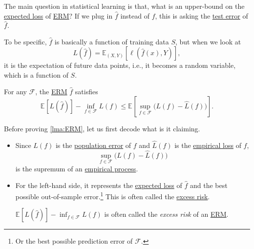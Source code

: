 The main question in statistical learning is that, what is an upper-bound on the \hyperref[def:expected-loss]{expected loss} of \hyperref[prb:ERM]{ERM}? If we plug in \(\hat{f} \) instead of \(f\), this is asking the \hyperref[def:expected-loss]{test error} of \(\hat{f} \).

To be specific, \(\hat{f} \) is basically a function of training data \(S\), but when we look at
\[
	L(\hat{f} ) = \mathbb{E}_{(X, Y)}\left[\ell (\hat{f} (x), Y) \right],
\]
it is the expectation of future data points, i.e., it becomes a random variable, which is a function of \(S\).

\begin{lemma}\label{lma:ERM}
	For any \(\mathscr{F} \), the \hyperref[prb:ERM]{ERM} \(\hat{f} \) satisfies
	\[
		\mathbb{E}_{}[L(\hat{f} ) ] - \inf _{f\in \mathscr{F} } L(f)
		\leq \mathbb{E}_{}\left[\sup _{f\in \mathscr{F} } \big(L(f) - \hat{L} (f) \big) \right] .
	\]
\end{lemma}

Before proving \autoref{lma:ERM}, let us first decode what is it claiming.
\begin{itemize}
	\item Since \(L(f)\) is the \hyperref[def:expected-loss]{population error} of \(f\) and \(\hat{L} (f)\) is the \hyperref[def:empirical-loss]{empirical loss} of \(f\),
	      \[
		      \sup _{f\in \mathscr{F} } \big( L(f) - \hat{L} (f) \big)
	      \]
	      is the supremum of an \hyperref[def:EP]{empirical process}.
	\item For the left-hand side, it represents the \hyperref[def:expected-loss]{expected loss} of \(\hat{f} \) and the best possible out-of-sample error.\footnote{Or the best possible prediction error of \(\mathscr{F} \).} This is often called the \hyperref[not:excess-risk]{excess risk}.
	      \begin{notation}\label{not:excess-risk}
		      \(\mathbb{E}_{}[L(\hat{f} ) ] - \inf _{f\in \mathscr{F} } L(f)\) is often called the \emph{excess risk} of an \hyperref[prb:ERM]{ERM}.
	      \end{notation}
\end{itemize}

